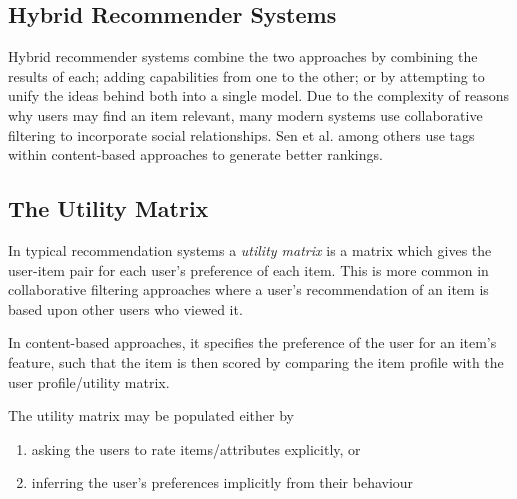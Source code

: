 \subsection{Hybrid Recommender Systems}

Hybrid recommender systems combine the two approaches by combining the results of each; adding capabilities from one to the other; or by attempting to unify the ideas behind both into a single model. Due to the complexity of reasons why users may find an item relevant, many modern systems \cite{ReferralWeb} use collaborative filtering to incorporate social relationships. Sen et al. \cite{SenTagommender} among others use tags within content-based approaches to generate better rankings. 

\subsection{The Utility Matrix}

In typical recommendation systems a \textit{utility matrix} is a matrix which gives the user-item pair for each user's preference of each item. This is more common in collaborative filtering approaches where a user's recommendation of an item is based upon other users who viewed it. 

In content-based approaches, it specifies the preference of the user for an item's feature, such that the item is then scored by comparing the item profile with the user profile/utility matrix.

The utility matrix may be populated either by
\begin{enumerate}
  \item asking the users to rate items/attributes explicitly, or
  \item inferring the user's preferences implicitly from their behaviour
\end{enumerate}
